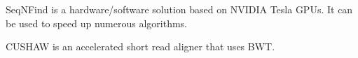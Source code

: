 \documentclass[../main/thesis.tex]{subfiles}
\begin{document}
SeqNFind \cite{SeqNFind} is a hardware/software solution based on NVIDIA Tesla GPUs.
It can be used to speed up numerous algorithms.


CUSHAW is an accelerated short read aligner that uses BWT.

\end{document}
